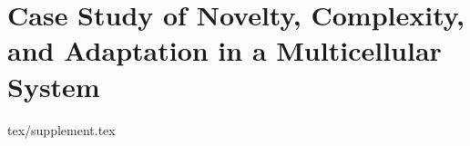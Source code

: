 \chapter{Case Study of Novelty, Complexity, and Adaptation in a Multicellular System}
\label{ch:measuring-cna-appendix}

{tex/supplement.tex}
